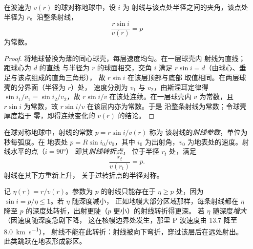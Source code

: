 \begin{theorem}[球形地球中的斯涅耳定律]\label{thm:b3:seismology-imaging:snell}
在波速为 $v(r)$ 的球对称地球中，设 $i$ 为
射线与该点处半径之间的夹角，该点处半径为 $r$。沿整条射线，
\[
  \frac{r\sin i}{v(r)} = p
\]
为常数。
\end{theorem}

\begin{proof}
将地球替换为薄的同心球壳，每层速度均匀。在一层球壳内
射线为直线；距球心为 $d$ 的直线
与半径为 $r$ 的球面相交，交角 $i$ 满足
$r\sin i = d$（由球心、垂足与该点组成的直角三角形），
故 $r\sin i$ 在该层顶部与底部
取值相同。在两层球壳的分界面（半径为 $r$）处，
速度分别为 $v_1$ 与 $v_2$，由斯涅耳定律得 $\sin i_1/v_1 = \sin i_2/v_2$，故
$r\sin i/v$ 在该处连续。在一层球壳内 $v$ 为常数，且
$r\sin i$ 为常数，故 $r\sin i/v$ 在该层内亦为常数。于是
沿整条射线为常数；令球壳厚度趋于
零，即得连续变化的 $v(r)$ 的结论。
\end{proof}

\begin{definition}\label{def:b3:seismology-imaging:ray-parameter}
在球对称地球中，射线的常数 $p = r\sin i/v(r)$ 称为
该射线的\emph{射线参数}，单位为秒每弧度。在
地表处 $p = R\sin i_0/v_0$，其中 $i_0$ 为出射角，$v_0$
为地表处的速度。射线水平的点（$i = \ang{90}$）
即其\emph{射线转折点}，
位于半径 $r_t$ 处，满足
\[
  \frac{r_t}{v(r_t)} = p .
\]
射线在其下方重新上升，
关于过转折点的半径对称。
\end{definition}

记 $\eta(r) = r/v(r)$。参数为 $p$ 的射线只能存在于
$\eta \ge p$ 处，因为 $\sin i = p/\eta \le 1$。若 $\eta$ 随深度减小，
正如地幔大部分区域那样，每条射线都在 $\eta$
降至 $p$ 的深度处转折，出射更陡（$p$ 更小）的射线转折得更深。
若 $\eta$ 随深度\emph{增大}（因速度随深度急剧下降，
这在核幔边界处发生，那里 P 波速度由
13.7 降至 \qty{8.0}{km.s^{-1}}），%
射线不能在此转折：射线被向下弯折，穿过该层后在远处射出。
此类跳跃在地表形成影区。

